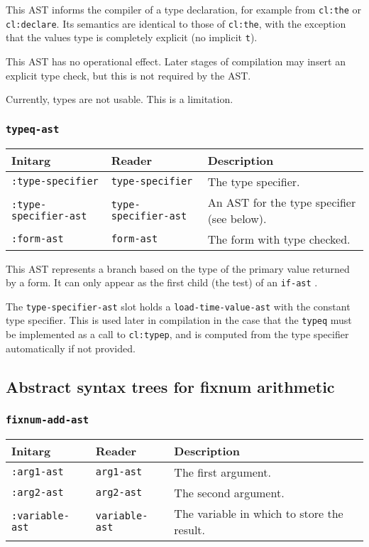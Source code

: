 This AST informs the compiler of a type declaration, for example
from \texttt{cl:the} or \texttt{cl:declare}. Its semantics are identical
to those of \texttt{cl:the}, with the exception that the values
type is completely explicit (no implicit \rest \texttt{t}).

This AST has no operational effect. Later stages of compilation may
insert an explicit type check, but this is not required by the AST.

Currently, \key types are not usable. This is a limitation.

\subsubsection{\texttt{typeq-ast}}
\label{typeq-ast}

\begin{tabular}{|l|l|l|}
\hline
Initarg & Reader & Description\\
\hline\hline
\texttt{:type-specifier} & \texttt{type-specifier} & The type specifier.\\
\hline
\texttt{:type-specifier-ast} & \texttt{type-specifier-ast} & An AST for the type specifier (see below).\\
\hline
\texttt{:form-ast} & \texttt{form-ast} & The form with type checked.\\
\hline
\end{tabular}

This AST represents a branch based on the type of the primary value
returned by a form. It can only appear as the first child (the test)
of an \texttt{if-ast} .

The \texttt{type-specifier-ast} slot holds a \texttt{load-time-value-ast}
with the constant type specifier. This is used later in compilation in the case that the \texttt{typeq} must be implemented as a call to
\texttt{cl:typep}, and is computed from the type specifier automatically
if not provided.

\subsection{Abstract syntax trees for fixnum arithmetic}

\subsubsection{\texttt{fixnum-add-ast}}
\label{fixnum-add-ast}

\begin{tabular}{|l|l|l|}
\hline
Initarg & Reader & Description\\
\hline\hline
\texttt{:arg1-ast} & \texttt{arg1-ast} & The first argument.\\
\hline
\texttt{:arg2-ast} & \texttt{arg2-ast} & The second argument.\\
\hline
\texttt{:variable-ast} & \texttt{variable-ast} & The variable in which to store the result.\\
\hline
\end{tabular}

